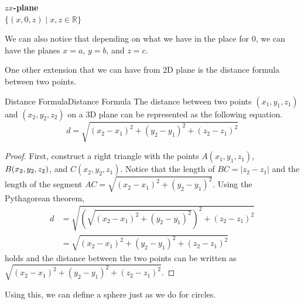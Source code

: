 \documentclass[../../../main.tex]{subfiles}
\begin{document}
\hfill
\begin{minipage}{0.3\textwidth}
\begin{center}
\textbf{$zx$-plane} \\
$\{ (x, 0, z) \mid x, z \in \mathbb{R} \}$
\end{center}
\begin{figure}[H]
\centering
{}
\end{figure}
\end{minipage}

We can also notice that depending on what we have in the place
for $0$, we can have the planes $x = a$, $y = b$, and $z = c$.

One other extension that we can have from 2D plane is the distance
formula between two points.

\begin{theorem}{Distance Formula}{Distance Formula}
The distance between two points $(x_1, y_1, z_1)$ and
$(x_2, y_2, z_2)$ on a 3D plane can be represented as the following
equation.
\[
d
= \sqrt{ (x_2 - x_1)^2 + (y_2 - y_1)^2 + (z_2 - z_1)^2 }
\]
\end{theorem}
\begin{proof}
First, construct a right triangle with the points $A(x_1, y_1, z_1)$,
$B(x_2, y_2, \linebreak z_2)$, and $C(x_2, y_2, z_1)$. Notice that
the length of $BC = |z_2 - z_1|$ and the length of the segment $AC =
\sqrt{(x_2 - x_1)^2 + (y_2 - y_1)^2}$. Using the Pythagorean theorem,
\begin{align*}
    d
    &= \sqrt{
        \left( \sqrt{(x_2 - x_1)^2 + (y_2 - y_1)^2} \right)^2
            + (z_2 - z_1)^2
    } \\
    &= \sqrt{ (x_2 - x_1)^2 + (y_2 - y_1)^2 + (z_2 - z_1)^2 }
\end{align*}
holds and the distance between the two points can be written as
$\sqrt{ (x_2 - x_1)^2 + (y_2 - y_1)^2 + (z_2 - z_1)^2 }$.
\end{proof}

Using this, we can define a sphere just as we do for circles.
\end{document}

